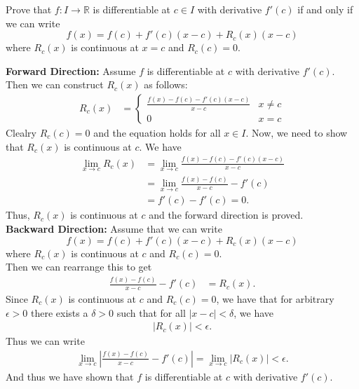 \documentclass[answers,12pt,addpoints]{exam}
\begin{document}
\begin{questions}
\question Prove that \( f : I \to \mathbb{R} \) is differentiable at \( c \in I \) with derivative \( f'(c) \) if and only if we can write 
\[
f(x) = f(c) + f'(c)(x - c) + R_c(x)(x - c)
\]
where \( R_c(x) \) is continuous at \( x = c \) and \( R_c(c) = 0 \).
\begin{solution}
\textbf{Forward Direction:} Assume \( f \) is differentiable at \( c \) with derivative \( f'(c) \). \\
Then we can construct $R_c(x)$ as follows:
\begin{align*}
    R_c(x) &= \begin{cases}
        \frac{f(x)-f(c)-f'(c)(x-c)}{x-c} & x \neq c \\
        0 & x = c
    \end{cases}
\end{align*}
Clealry \( R_c(c) = 0 \) and the equation holds for all \( x \in I \). Now, we need to show that \( R_c(x) \) is continuous at \( c \). We have
\begin{align*}
    \lim_{x \to c} R_c(x) &= \lim_{x \to c} \frac{f(x) - f(c) - f'(c)(x - c)}{x - c} \\
    &= \lim_{x \to c} \frac{f(x) - f(c)}{x - c} - f'(c) \\
    &= f'(c) - f'(c) = 0.
\end{align*}
Thus, \( R_c(x) \) is continuous at \( c \) and the forward direction is proved.\\
\textbf{Backward Direction:} Assume that we can write
\[
f(x) = f(c) + f'(c)(x - c) + R_c(x)(x - c)
\]
where \( R_c(x) \) is continuous at \( c \) and \( R_c(c) = 0 \). \\
Then we can rearrange this to get
\begin{align*}
    \frac{f(x) - f(c)}{x - c} - f'(c) &= R_c(x).
\end{align*}
Since \( R_c(x) \) is continuous at \( c \) and \( R_c(c) = 0 \), we have that for arbitrary $\epsilon>0$ there exists a \( \delta > 0 \) such that for all \( |x - c| < \delta \), we have
\begin{align*}
    \left| R_c(x) \right| < \epsilon.
\end{align*}
Thus we can write
\begin{align*}
    \lim_{x \to c } \left| \frac{f(x) - f(c)}{x - c} - f'(c) \right| = \lim_{x \to c} \left| R_c(x) \right| < \epsilon.
\end{align*}
And thus we have shown that \( f \) is differentiable at \( c \) with derivative \( f'(c) \).\\
\end{solution}


\end{questions}
\end{document}
